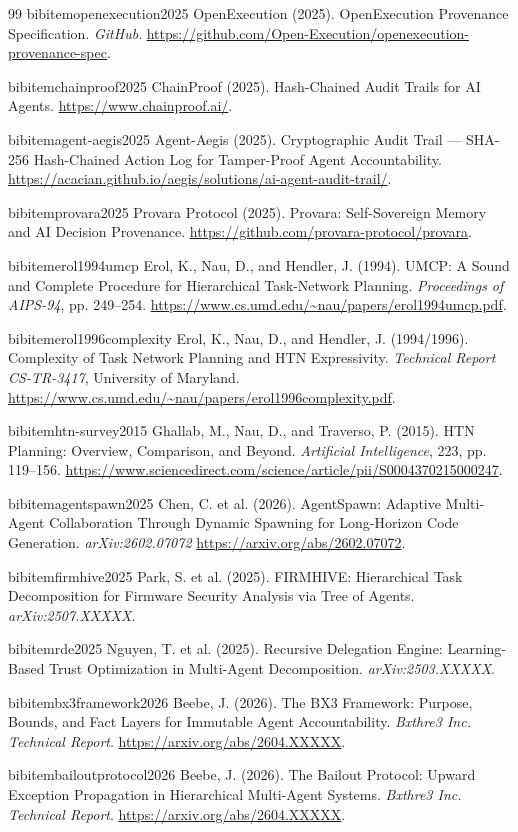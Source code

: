 \begin{thebibliography}{99}
 bibitem{openexecution2025}
 OpenExecution (2025). OpenExecution Provenance Specification. \textit{GitHub}. \url{https://github.com/Open-Execution/openexecution-provenance-spec}.

 bibitem{chainproof2025}
 ChainProof (2025). Hash-Chained Audit Trails for AI Agents. \url{https://www.chainproof.ai/}.

 bibitem{agent-aegis2025}
 Agent-Aegis (2025). Cryptographic Audit Trail — SHA-256 Hash-Chained Action Log for Tamper-Proof Agent Accountability. \url{https://acacian.github.io/aegis/solutions/ai-agent-audit-trail/}.

 bibitem{provara2025}
 Provara Protocol (2025). Provara: Self-Sovereign Memory and AI Decision Provenance. \url{https://github.com/provara-protocol/provara}.


 bibitem{erol1994umcp}
 Erol, K., Nau, D., and Hendler, J. (1994). UMCP: A Sound and Complete Procedure for Hierarchical Task-Network Planning. \textit{Proceedings of AIPS-94}, pp. 249--254. \url{https://www.cs.umd.edu/~nau/papers/erol1994umcp.pdf}.

 bibitem{erol1996complexity}
 Erol, K., Nau, D., and Hendler, J. (1994/1996). Complexity of Task Network Planning and HTN Expressivity. \textit{Technical Report CS-TR-3417}, University of Maryland. \url{https://www.cs.umd.edu/~nau/papers/erol1996complexity.pdf}.

 bibitem{htn-survey2015}
 Ghallab, M., Nau, D., and Traverso, P. (2015). HTN Planning: Overview, Comparison, and Beyond. \textit{Artificial Intelligence}, 223, pp. 119--156. \url{https://www.sciencedirect.com/science/article/pii/S0004370215000247}.

 bibitem{agentspawn2025}
 Chen, C. et al. (2026). AgentSpawn: Adaptive Multi-Agent Collaboration Through Dynamic Spawning for Long-Horizon Code Generation. \textit{arXiv:2602.07072} \url{https://arxiv.org/abs/2602.07072}.

 bibitem{firmhive2025}
 Park, S. et al. (2025). FIRMHIVE: Hierarchical Task Decomposition for Firmware Security Analysis via Tree of Agents. \textit{arXiv:2507.XXXXX}.

 bibitem{rde2025}
 Nguyen, T. et al. (2025). Recursive Delegation Engine: Learning-Based Trust Optimization in Multi-Agent Decomposition. \textit{arXiv:2503.XXXXX}.

 bibitem{bx3framework2026}
 Beebe, J. (2026). The BX3 Framework: Purpose, Bounds, and Fact Layers for Immutable Agent Accountability. \textit{Bxthre3 Inc. Technical Report}. \url{https://arxiv.org/abs/2604.XXXXX}.

 bibitem{bailoutprotocol2026}
 Beebe, J. (2026). The Bailout Protocol: Upward Exception Propagation in Hierarchical Multi-Agent Systems. \textit{Bxthre3 Inc. Technical Report}. \url{https://arxiv.org/abs/2604.XXXXX}.
\end{thebibliography}